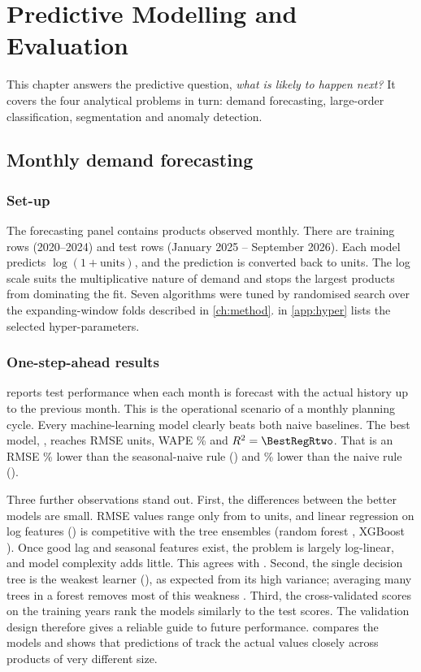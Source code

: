 \chapter{Predictive Modelling and Evaluation}\label{ch:models}

This chapter answers the predictive question, \emph{what is likely to happen next?} It covers the four
analytical problems in turn: demand forecasting, large-order classification, segmentation and anomaly detection.

\section{Monthly demand forecasting}
\subsection{Set-up}
The forecasting panel contains \PanelSeries products observed monthly. There are \PanelTrain training rows
(2020--2024) and \PanelTest test rows (January 2025 -- September 2026). Each model predicts
$\log(1+\text{units})$, and the prediction is converted back to units. The log scale suits the multiplicative
nature of demand and stops the largest products from dominating the fit. Seven algorithms were tuned by
randomised search over the expanding-window folds described in \cref{ch:method}.  in
\cref{app:hyper} lists the selected hyper-parameters.

\subsection{One-step-ahead results}
 reports test performance when each month is forecast with the actual history up to the
previous month. This is the operational scenario of a monthly planning cycle. Every machine-learning model
clearly beats both naive baselines. The best model, \BestReg, reaches RMSE \BestRegRMSE units, WAPE
\BestRegWAPE\% and $R^2=\BestRegRtwo$. That is an RMSE \GainVsSNaive\% lower than the seasonal-naive rule
(\SNaiveRMSE) and \GainVsNaive\% lower than the naive rule (\NaiveRMSE).



Three further observations stand out. First, the differences between the better models are small. RMSE values
range only from \BestRegRMSE to \WorstRegRMSE units, and linear regression on log features (\LinRMSE) is
competitive with the tree ensembles (random forest \RFRMSE, XGBoost \XGBRMSE). Once good lag and seasonal
features exist, the problem is largely log-linear, and model complexity adds little. This agrees with
\citet{makridakis2018}. Second, the single decision tree is the weakest learner (\DTRMSE), as expected from its
high variance; averaging many trees in a forest removes most of this weakness \citep{breiman2001}. Third, the
cross-validated scores on the training years rank the models similarly to the test scores. The validation
design therefore gives a reliable guide to future performance.  compares the models and
shows that predictions of \BestReg track the actual values closely across products of very different size.


